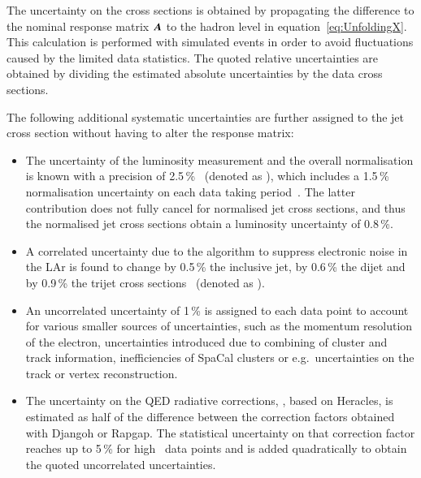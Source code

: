 \documentclass[12pt]{article}
\begin{document}
\begin{itemize}
\end{itemize}
The uncertainty on the cross sections is obtained by propagating the difference to the nominal response matrix $\A$ 
to the hadron level in equation~\ref{eq:UnfoldingX}.
This calculation is performed with simulated events in order
to avoid fluctuations caused by the limited data statistics.
The quoted relative uncertainties are obtained by dividing the estimated absolute uncertainties by the data cross sections.


The following additional systematic uncertainties are further assigned to the jet cross section without having to alter the response matrix:
\begin{itemize}
\item The uncertainty of the luminosity measurement and the overall normalisation is known with a precision of 2.5\,\%~\cite{AaronQED} (denoted as \DNorm{}), 
  which includes a 1.5\,\% normalisation uncertainty on each data taking period~\cite{AaronQED,H1NCDISHighQ2}. 
  The latter contribution does not fully cancel for normalised jet cross sections, and thus the normalised jet cross sections obtain a luminosity uncertainty of 0.8\,\%.

\item A correlated uncertainty due to the algorithm to suppress electronic noise in the LAr is found to change by 0.5\,\% the inclusive jet, by 0.6\,\% the dijet and by 0.9\,\% the trijet cross sections~\cite{H1Multijets} (denoted as \DLAr{\csdsub}).

\item An uncorrelated uncertainty of 1\,\% is assigned to each data point to account for various smaller sources of uncertainties, such as the momentum resolution of the electron, uncertainties introduced due to combining of cluster and track information, inefficiencies of SpaCal clusters or e.g.\ uncertainties on the track or vertex reconstruction.

\item The uncertainty on the QED radiative corrections, \DRad{}, based on Heracles, is estimated as half of the difference between the correction factors obtained with Djangoh or Rapgap. 
The statistical uncertainty on that correction factor reaches up to 5\,\% for high \pt\ data points and is added quadratically to obtain the quoted uncorrelated uncertainties.
\end{itemize}
\end{document}
